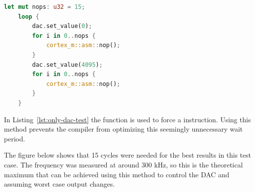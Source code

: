 \begin{lstlisting}[language=Rust,frame=single,float=!ht,style=customrust,label={lst:only-dac-test},caption={Code for Testing DAC Frequency Limit}]
    let mut nops: u32 = 15;
    loop {
        dac.set_value(0);
        for i in 0..nops {
            cortex_m::asm::nop();
        }
        dac.set_value(4095);
        for i in 0..nops {
            cortex_m::asm::nop();
        }
    }
\end{lstlisting}

In Listing~\ref{lst:only-dac-test} the  function is used to force a  instruction. Using this method prevents the compiler from optimizing this seemingly unnecessary wait period.

The figure below shows that 15 cycles were needed for the best results in this test case. The frequency was measured at around 300 kHz, so this is the theoretical maximum that can be achieved using this method to control the DAC and assuming worst case output changes.

